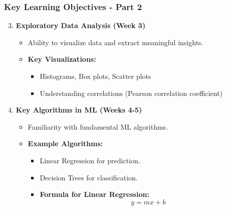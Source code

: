 \documentclass[aspectratio=169]{beamer}
\begin{document}
\begin{frame}
    \frametitle{Key Learning Objectives - Part 2}
    \begin{enumerate}
        \setcounter{enumi}{2} %
        
        \item \textbf{Exploratory Data Analysis (Week 3)}
        \begin{itemize}
            \item Ability to visualize data and extract meaningful insights.
            \item \textbf{Key Visualizations:}
            \begin{itemize}
                \item Histograms, Box plots, Scatter plots
                \item Understanding correlations (Pearson correlation coefficient)
            \end{itemize}
        \end{itemize}

        \item \textbf{Key Algorithms in ML (Weeks 4-5)}
        \begin{itemize}
            \item Familiarity with fundamental ML algorithms.
            \item \textbf{Example Algorithms:}
            \begin{itemize}
                \item Linear Regression for prediction.
                \item Decision Trees for classification.
                \item \textbf{Formula for Linear Regression:}
                \begin{equation}
                y = mx + b
                \end{equation}
            \end{itemize}
        \end{itemize}
    \end{enumerate}
\end{frame}
\end{document}
